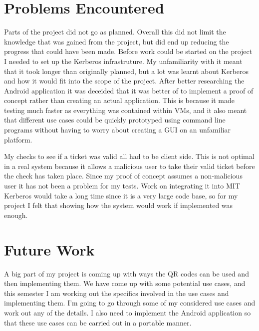 \documentclass[]{report}   %
\begin{document}
\section{Problems Encountered}
Parts of the project did not go as planned. Overall this did not limit the knowledge that was gained from the project, but did end up reducing the progress that could have been made. Before work could be started on the project I needed to set up the Kerberos infrastruture. My unfamiliarity with it meant that it took longer than originally planned, but a lot was learnt about Kerberos and how it would fit into the scope of the project. After better researching the Android application it was deceided that it was better of to implement a proof of concept rather than creating an actual application. This is because it made testing much faster as everything was contained within VMs, and it also meant that different use cases could be quickly prototyped using command line programs without having to worry about creating a GUI on an unfamiliar platform.

My checks to see if a ticket was valid all had to be client side. This is not optimal in a real system because it allows a malicious user to take their valid ticket before the check has taken place. Since my proof of concept assumes a non-malicious user it has not been a problem for my tests. Work on integrating it into MIT Kerberos would take a long time since it is a very large code base, so for my project I felt that showing how the system would work if implemented was enough.



\section{Future Work}
A big part of my project is coming up with ways the QR codes can be used and then implementing them. We have come up with some potential use cases, and this semester I am working out the specifics involved in the use cases and implementing them. I’m going to go through some of my considered use cases and work out any of the details. I also need to implement the Android application so that these use cases can be carried out in a portable manner.
\end{document}
